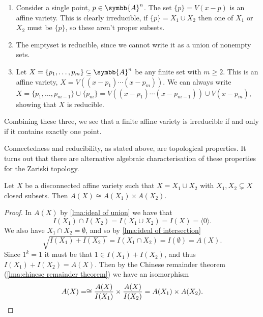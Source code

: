 \documentclass[fleqn]{NotesClass}
\newcommand{\affine}{\symbb{A}}
\newcommand{\isomorphic}{\cong}
\begin{document}
    \begin{exm}{}{}
        \begin{enumerate}
            \item Consider a single point, \(p \in \affine^n\).
            The set \(\{p\} = V(x - p)\) is an affine variety.
            This is clearly irreducible, if \(\{p\} = X_1 \cup X_2\) then one of \(X_1\) or \(X_2\) must be \(\{p\}\), so these aren't proper subsets.
            
            \item The emptyset is reducible, since we cannot write it as a union of nonempty sets.
            
            \item Let \(X = \{p_1, \dotsc, p_m\} \subseteq \affine^n\) be any finite set with \(m \ge 2\).
            This is an affine variety, \(X = V((x - p_1) \dotsm (x - p_m))\).
            We can always write \(X = \{p_1, \dotsc, p_{m-1}\} \cup \{p_m\} = V((x - p_1) \dotsm (x - p_{m-1})) \cup V(x - p_m)\), showing that \(X\) is reducible.
        \end{enumerate}
        Combining these three, we see that a finite affine variety is irreducible if and only if it contains exactly one point.
    \end{exm}
    
    Connectedness and reducibility, as stated above, are topological properties.
    It turns out that there are alternative algebraic characterisation of these properties for the Zariski topology.
    
    \begin{prp}{}{}
        Let \(X\) be a disconnected affine variety such that \(X = X_1 \cup X_2\) with \(X_1, X_2 \subsetneq X\) closed subsets.
        Then \(A(X) \isomorphic A(X_1) \times A(X_2)\).
        \begin{proof}
            In \(A(X)\) by \cref{lma:ideal of union} we have that
            \begin{equation}
                I(X_1) \cap I(X_2) = I(X_1 \cup X_2) = I(X) = \langle 0 \rangle.
            \end{equation}
            We also have \(X_1 \cap X_2 = \emptyset\), and so by \cref{lma:ideal of intersection}
            \begin{equation}
                \sqrt{I(X_1) + I(X_2)} = I(X_1 \cap X_2) = I(\emptyset) = A(X).
            \end{equation}
            Since \(1^k = 1\) it must be that \(1 \in I(X_1) + I(X_2)\), and thus \(I(X_1) + I(X_2) = A(X)\).
            Then by the Chinese remainder theorem (\cref{lma:chinese remainder theorem}) we have an isomorphism
            \begin{equation}
                A(X) = \isomorphic \frac{A(X)}{I(X_1)} \times \frac{A(X)}{I(X_2)} = A(X_1) \times A(X_2). \qedhere
            \end{equation}
        \end{proof}
    \end{prp}
    
\end{document}
